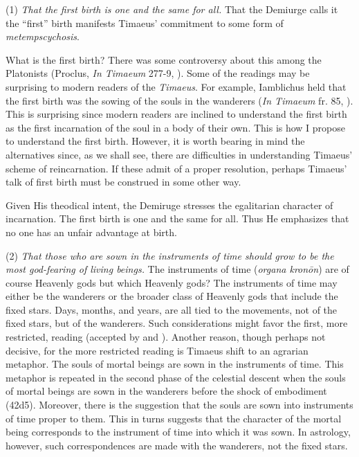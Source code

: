 (1) \emph{That the first birth is one and the same for all.} That the Demiurge calls it the ``first'' birth manifests Timaeus' commitment to some form of \emph{metempscychosis}.

What is the first birth? There was some controversy about this among the Platonists (Proclus, \emph{In Timaeum} 277-9, \citealt{Diehl:1903re}). Some of the readings may be surprising to modern readers of the \emph{Timaeus}. For example, Iamblichus held that the first birth was the sowing of the souls in the wanderers (\emph{In Timaeum} fr. 85, \citealt{Dillon:1973qv}). This is surprising since modern readers are inclined to understand the first birth as the first incarnation of the soul in a body of their own. This is how I propose to understand the first birth. However, it is worth bearing in mind the alternatives since, as we shall see, there are difficulties in understanding Timaeus' scheme of reincarnation. If these admit of a proper resolution, perhaps Timaeus' talk of first birth must be construed in some other way.

Given His theodical intent, the Demiruge stresses the egalitarian character of incarnation. The first birth is one and the same for all. Thus He emphasizes that no one has an unfair advantage at birth. 

(2) \emph{That those who are sown in the instruments of time should grow to be the most god-fearing of living beings.} The instruments of time (\emph{organa kronōn}) are of course Heavenly gods but which Heavenly gods? The instruments of time may either be the wanderers or the broader class of Heavenly gods that include the fixed stars. Days, months, and years, are all tied to the movements, not of the fixed stars, but of the wanderers. Such considerations might favor the first, more restricted, reading (accepted by \citealt[143 n4]{Archer-Hind:1888qd} and \citealt[258--9]{Taylor:1928qb}). Another reason, though perhaps not decisive, for the more restricted reading is Timaeus shift to an agrarian metaphor. The souls of mortal beings are sown in the instruments of time. This metaphor is repeated in the second phase of the celestial descent when the souls of mortal beings are sown in the wanderers before the shock of embodiment (42d5). Moreover, there is the suggestion that the souls are sown into instruments of time proper to them. This in turns suggests that the character of the mortal being corresponds to the instrument of time into which it was sown. In astrology, however, such correspondences are made with the wanderers, not the fixed stars.

